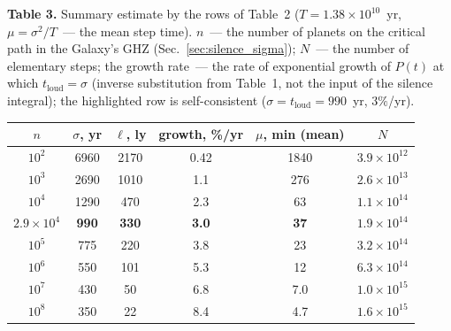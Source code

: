 \documentclass[11pt,a4paper]{article}
\begin{document}
\begin{center}
\textbf{Table 3.} Summary estimate by the rows of Table~2 ($T = 1.38 \times 10^{10}$~yr, $\mu = \sigma^2/T$~--- the mean step time). $n$~--- the number of planets on the critical path in the Galaxy's GHZ (Sec.~\ref{sec:silence_sigma}); $N$~--- the number of elementary steps; the growth rate~--- the rate of exponential growth of $P(t)$ at which $t_{\mathrm{loud}}=\sigma$ (inverse substitution from Table~1, not the input of the silence integral); the highlighted row is self-consistent ($\sigma=t_{\mathrm{loud}}=990$~yr, $3\%$/yr).

\medskip
\begin{tabular}{cccccc}
\toprule
$n$ & $\sigma$, yr & $\ell$, ly & growth, \%/yr & $\mu$, min (mean) & $N$ \\
\midrule
$10^2$ & 6960 & 2170 & 0.42 & 1840 & $3.9 \times 10^{12}$ \\
$10^3$ & 2690 & 1010 & 1.1 & 276 & $2.6 \times 10^{13}$ \\
$10^4$ & 1290 & 470 & 2.3 & 63 & $1.1 \times 10^{14}$ \\
\textbf{$2.9 \times 10^4$} & \textbf{990} & \textbf{330} & \textbf{3.0} & \textbf{37} & \textbf{$1.9 \times 10^{14}$} \\
$10^5$ & 775 & 220 & 3.8 & 23 & $3.2 \times 10^{14}$ \\
$10^6$ & 550 & 101 & 5.3 & 12 & $6.3 \times 10^{14}$ \\
$10^7$ & 430 & 50 & 6.8 & 7.0 & $1.0 \times 10^{15}$ \\
$10^8$ & 350 & 22 & 8.4 & 4.7 & $1.6 \times 10^{15}$ \\
\bottomrule
\end{tabular}
\end{center}
\end{document}
